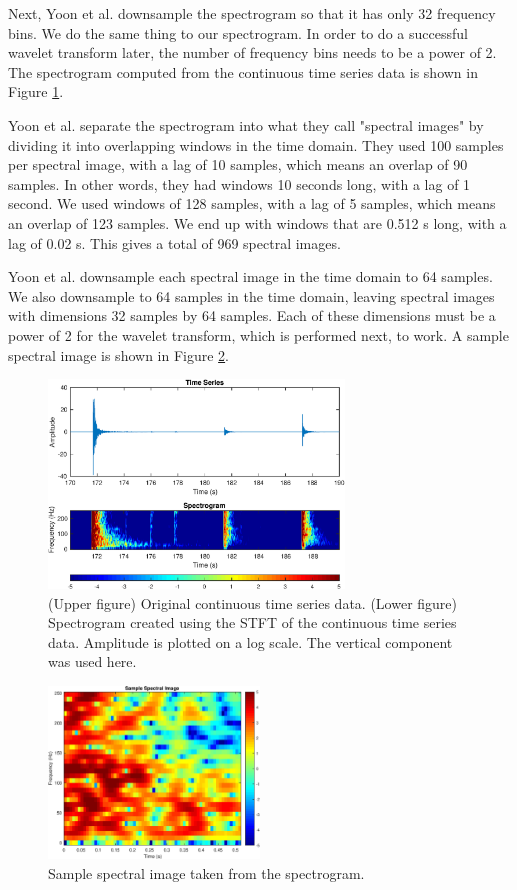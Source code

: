 Next, Yoon et al. downsample the spectrogram so that it has only 32 frequency bins. We do the same thing to our spectrogram. In order to do a successful wavelet transform later, the number of frequency bins needs to be a power of 2. The spectrogram computed from the continuous time series data is shown in Figure \ref{fig:spec}.

Yoon et al. separate the spectrogram into what they call "spectral images" by dividing it into overlapping windows in the time domain. They used 100 samples per spectral image, with a lag of 10 samples, which means an overlap of 90 samples. In other words, they had windows 10 seconds long, with a lag of 1 second. We used windows of 128 samples, with a lag of 5 samples, which means an overlap of 123 samples. We end up with windows that are 0.512 s long, with a lag of 0.02 s. This gives a total of 969 spectral images.

Yoon et al. downsample each spectral image in the time domain to 64 samples. We also downsample to 64 samples in the time domain, leaving spectral images with dimensions 32 samples by 64 samples. Each of these dimensions must be a power of 2 for the wavelet transform, which is performed next, to work. A sample spectral image is shown in Figure \ref{fig:specim}. 
\begin{figure}
	\centering
\includegraphics[width=0.7\textwidth]{sampleSpectrogram}
\caption{(Upper figure) Original continuous time series data. (Lower figure) Spectrogram created using the STFT of the continuous time series data. Amplitude is plotted on a log scale. The vertical component was used here.}
\label{fig:spec}
\end{figure}

\begin{figure}
	\centering
\includegraphics[width=0.5\textwidth]{sampleSpectralImage}
\caption{Sample spectral image taken from the spectrogram.}
\label{fig:specim}
\end{figure}
